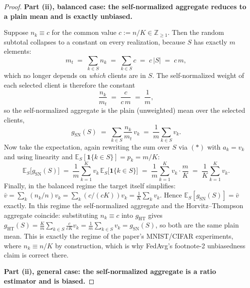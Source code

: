 \documentclass[11pt]{article}
\theoremstyle{definition}
\theoremstyle{remark}
\begin{document}
\begin{proof}
\medskip
\noindent\textbf{Part (ii), balanced case: the self-normalized aggregate reduces to a plain mean and is exactly unbiased.}

Suppose $n_k\equiv c$ for the common value $c:=n/K\in\mathbb{Z}_{\ge1}$. Then the random subtotal collapses to a constant on every realization, because $S$ has exactly $m$ elements:
\[
m_t \;=\; \sum_{k\in S}n_k \;=\; \sum_{k\in S} c \;=\; c\,|S| \;=\; c\,m ,
\]
which no longer depends on \emph{which} clients are in $S$. The self-normalized weight of each selected client is therefore the constant
\[
\frac{n_k}{m_t} \;=\; \frac{c}{c\,m} \;=\; \frac{1}{m},
\]
so the self-normalized aggregate is the plain (unweighted) mean over the selected clients,
\[
g_{\mathrm{SN}}(S) \;=\; \sum_{k\in S}\frac{n_k}{m_t}\,v_k \;=\; \frac{1}{m}\sum_{k\in S}v_k .
\]
Now take the expectation, again rewriting the sum over $S$ via $(\ast)$ with $a_k=v_k$ and using linearity and $\mathbb{E}_S[\mathbf 1\{k\in S\}]=p_k=m/K$:
\[
\mathbb{E}_S\big[g_{\mathrm{SN}}(S)\big]
\;=\;\frac{1}{m}\sum_{k=1}^{K}v_k\,\mathbb{E}_S\big[\mathbf 1\{k\in S\}\big]
\;=\;\frac{1}{m}\sum_{k=1}^{K}v_k\cdot\frac{m}{K}
\;=\;\frac{1}{K}\sum_{k=1}^{K}v_k .
\]
Finally, in the balanced regime the target itself simplifies: $\bar v=\sum_k (n_k/n)v_k=\sum_k (c/(cK))v_k=\frac1K\sum_k v_k$. Hence $\mathbb{E}_S[g_{\mathrm{SN}}(S)]=\bar v$ exactly. In this regime the self-normalized aggregate and the Horvitz--Thompson aggregate coincide: substituting $n_k\equiv c$ into $g_{\mathrm{HT}}$ gives $g_{\mathrm{HT}}(S)=\frac{K}{m}\sum_{k\in S}\frac{c}{cK}v_k=\frac1m\sum_{k\in S}v_k=g_{\mathrm{SN}}(S)$, so both are the same plain mean. This is exactly the regime of the paper's MNIST/CIFAR experiments, where $n_k\equiv n/K$ by construction, which is why FedAvg's footnote-2 unbiasedness claim is correct there.

\medskip
\noindent\textbf{Part (ii), general case: the self-normalized aggregate is a ratio estimator and is biased.}


\end{proof}
\end{document}
